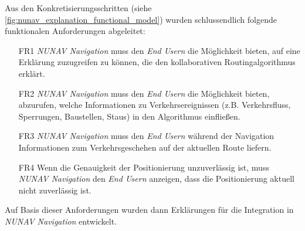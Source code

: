 Aus den Konkretisierungsschritten (siehe \autoref{fig:nunav_explanation_functional_model}) wurden schlussendlich folgende funktionalen Anforderungen abgeleitet:

\begin{enumerate}
    \item [FR1] \textit{NUNAV Navigation} muss den \textit{End Usern} die Möglichkeit bieten, auf eine Erklärung zuzugreifen zu können, die den kollaborativen Routingalgorithmus erklärt.
    \item [FR2] \textit{NUNAV Navigation} muss den \textit{End Usern} die Möglichkeit bieten, abzurufen, welche Informationen zu Verkehrsereignissen (z.B. Verkehrsfluss, Sperrungen, Baustellen, Staus) in den Algorithmus einfließen.
    \item [FR3] \textit{NUNAV Navigation} muss den \textit{End Usern} während der Navigation Informationen zum Verkehrsgeschehen auf der aktuellen Route liefern.
    \item [FR4] Wenn die Genauigkeit der Positionierung unzuverlässig ist, muss \textit{NUNAV Navigation} den \textit{End Usern} anzeigen, dass die Positionierung aktuell nicht zuverlässig ist.
\end{enumerate}

Auf Basis dieser Anforderungen wurden dann Erklärungen für die Integration in \textit{NUNAV Navigation} entwickelt.